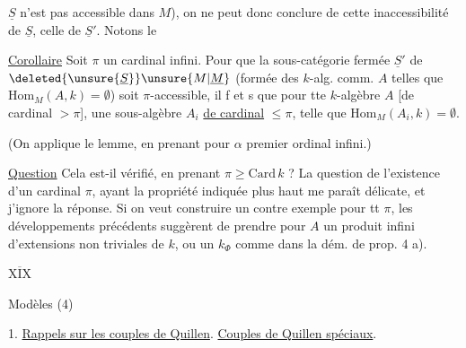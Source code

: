 $\underline S$ n'est pas accessible dans $M$), on ne peut donc
conclure de cette inaccessibilité de $\underline S$, celle de
$\underline S'$. Notons le

\uline{Corollaire} Soit $\pi$ un cardinal infini. Pour que la
sous-catégorie fermée $\underline S'$ de
$\deleted{\unsure{\underline S}}\unsure{M|\underline M}$ (formée
des  $k$-alg. comm. $A$ telles que
$\mathrm{Hom}_M(A,k)=\emptyset$) soit $\pi$-accessible, il f et s
que pour tte $k$-algèbre $A$ [de cardinal $>\pi$],
 une sous-algèbre $A_i$
\uline{de cardinal} $\leq\pi$, telle que
$\mathrm{Hom}_M(A_i,k)=\emptyset$.

(On applique le lemme, en prenant pour $\alpha$  premier
ordinal infini.)

\uline{Question} Cela est-il vérifié, en prenant 
$\pi\geq\mathrm{Card}\,k$ ? La question de l'existence
d'un cardinal $\pi$, ayant la propriété indiquée plus haut me paraît
délicate, et j'ignore la réponse. Si on veut construire un
contre exemple pour tt $\pi$, les développements précédents suggèrent
de prendre pour $A$ un produit infini d'extensions non triviales de
$k$, ou un  $k_{\Phi}$ comme dans
la dém. de prop. 4 a).

\uline{$\overline{\mathrm{XIX}}$}

Modèles (4)


1. \uline{Rappels sur les couples de Quillen}. \uline{Couples de Quillen spéciaux}.

